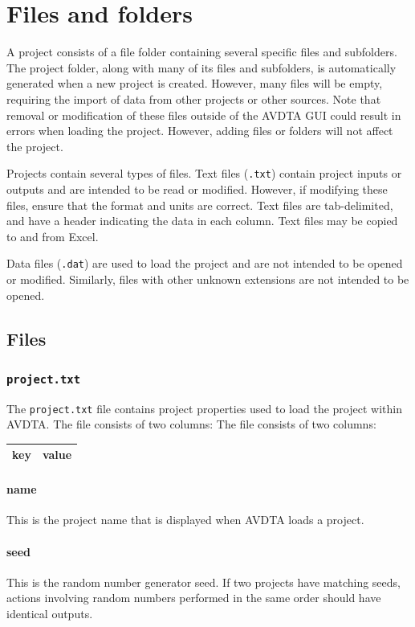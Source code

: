 \section{Files and folders}

A project consists of a file folder containing several specific files and subfolders. The project folder, along with many of its files and subfolders, is automatically generated when a new project is created. However, many files will be empty, requiring the import of data from other projects or other sources. Note that removal or modification of these files outside of the AVDTA GUI could result in errors when loading the project. However, adding files or folders will not affect the project. 

Projects contain several types of files. Text files (\texttt{.txt}) contain project inputs or outputs and are intended to be read or modified. However, if modifying these files, ensure that the format and units are correct. Text files are tab-delimited, and have a header indicating the data in each column. Text files may be copied to and from Excel.

Data files (\texttt{.dat}) are used to load the project and are not intended to be opened or modified. Similarly, files with other unknown extensions are not intended to be opened.

\subsection{Files}

\subsubsection{\texttt{project.txt}}
The \texttt{project.txt} file contains project properties used to load the project within AVDTA. The file consists of two columns:
 The file consists of two columns:
\begin{center}
\begin{tabular}{cc}
\hline
key & value\\\hline
\end{tabular}
\end{center}


\paragraph*{name}
This is the project name that is displayed when AVDTA loads a project.

\paragraph*{seed}
This is the random number generator seed. If two projects have matching seeds, actions involving random numbers performed in the same order should have identical outputs.

